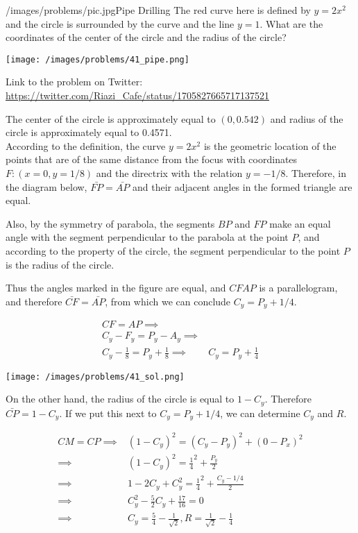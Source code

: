 \begin{problem}{/images/problems/pic.jpg}{Pipe Drilling}
	The red curve here is defined by $y = 2x^2$ and the circle is surrounded by the curve and the line $y=1$. What are the coordinates of the center of the circle and the radius of the circle?

\begin{center}
	\texttt{[image: /images/problems/41\_pipe.png]}
\end{center}

Link to the problem on Twitter: \url{https://twitter.com/Riazi_Cafe/status/1705827665717137521}
\end{problem}
\begin{solution}
The center of the circle is approximately equal to $(0,0.542)$ and radius of the circle is approximately equal to 0.4571.\\[0.2cm]

According to the definition, the curve $y=2x^2$ is the geometric location of the points that are of the same distance from the focus with coordinates $F: (x=0, y=1/8)$ and the directrix with the relation $y=-1/8$.
Therefore, in the diagram below, $\bar{FP}=\bar{AP}$ and their adjacent angles in the formed triangle are equal.

Also, by the symmetry of parabola, the segments $BP$ and $FP$ make an equal angle with the segment perpendicular to the parabola at the point $P$, and according to the property of the circle, the segment perpendicular to the point $P$ is the radius of the circle.

Thus the angles marked in the figure are equal, and $CFAP$ is a parallelogram, and therefore $\bar{CF}=\bar{AP}$, from which we can conclude $C_y=P_y+1/4$.

$$\begin{aligned}
CF = AP \implies& \\
C_y - F_y = P_y - A_y \implies& \\
C_y - \frac{1}{8} = P_y + \frac{1}{8} \implies& C_y=P_y+\frac{1}{4}
\end{aligned}$$

\begin{center}
	\texttt{[image: /images/problems/41\_sol.png]}
\end{center}

On the other hand, the radius of the circle is equal to $1-C_y$. Therefore $\bar{CP}=1-C_y$. If we put this next to $C_y=P_y+1/4$, we can determine $C_y$ and $R$.

$$\begin{aligned}
CM = CP \implies& (1 - C_y)^2 = (C_y - P_y)^2 + (0 - P_x)^2 \\
\implies& (1 - C_y)^2 = \frac{1}{4}^2 + \frac{P_y}{2} \\
\implies& 1 - 2C_y + C_y^2  = \frac{1}{4}^2 + \frac{C_y-1/4}{2} \\
\implies& C_y^2 - \frac{5}{2}C_y + \frac{17}{16} = 0 \\
\implies& C_y = \frac{5}{4} - \frac{1}{\sqrt{2}}, R = \frac{1}{\sqrt{2}} - \frac{1}{4}
\end{aligned}$$


\end{solution}